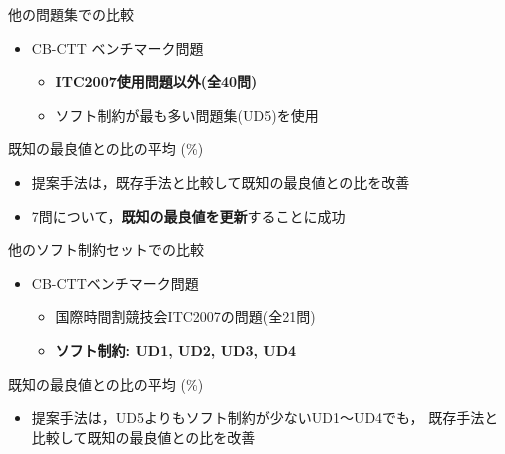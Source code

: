 \documentclass[11pt,dvipdfmx]{beamer}
\newcommand{\backupend}{
   \addtocounter{framenumberappendix}{-\value{framenumber}}
   \addtocounter{framenumber}{\value{framenumberappendix}} 
}
\begin{document}
\begin{frame}{他の問題集での比較}
  \begin{itemize}
  \item CB-CTT ベンチマーク問題
    \begin{itemize}
    \item \textbf{ITC2007使用問題以外(全40問)}
    \item ソフト制約が最も多い問題集(UD5)を使用
    \end{itemize}
  \end{itemize}
  \begin{exampleblock}{既知の最良値との比の平均 (\%)}
  \begin{center}
    \begin{tableD}
      
    \end{tableD}
  \end{center}
  \end{exampleblock}
  \begin{itemize}
  \item 提案手法は，既存手法と比較して既知の最良値との比を改善
  \item 7問について，\alert{\bf 既知の最良値を更新}することに成功
  \end{itemize}
\end{frame}
\begin{frame}{他のソフト制約セットでの比較}
  \begin{itemize}
  \item CB-CTTベンチマーク問題
    \begin{itemize}
    \item 国際時間割競技会ITC2007の問題(全21問)
    \item \textbf{ソフト制約: UD1, UD2, UD3, UD4}
    \end{itemize}
  \end{itemize}
  \begin{exampleblock}{既知の最良値との比の平均 (\%)}
  \begin{center}
    \begin{tableE}
      
    \end{tableE}
  \end{center}
  \end{exampleblock}
  \begin{itemize}
  \item 提案手法は，UD5よりもソフト制約が少ないUD1〜UD4でも，
    既存手法と比較して既知の最良値との比を改善
  \end{itemize}
\end{frame}

\backupend
\end{document}
